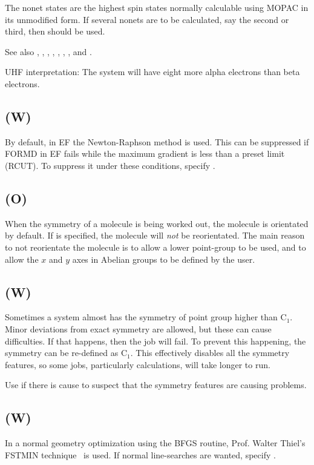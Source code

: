         The nonet states are the highest spin  states  normally  calculable
   using MOPAC in its unmodified form.
     If several nonets are to be calculated, say the second
   or third, then  should be used.

See also , , , , ,
, , and .

        UHF interpretation:  The system will have eight more alpha  electrons
   than beta electrons.

\subsection*{ (W)}
  By default, in EF the Newton-Raphson method is used.  This can be suppressed
if FORMD in EF fails while the maximum gradient is less than a preset limit
(RCUT). To suppress it under these conditions, specify .

\subsection*{ (O)}
When the symmetry of a molecule is being worked out, the molecule is
orientated by default.  If  is specified, the molecule will
{\em not} be reorientated.  The main reason to not reorientate the molecule
is to allow a lower point-group to be used, and to allow the $x$ and $y$ axes
in Abelian groups to be defined by the user.

\subsection*{ (W)}
\label{nosym}
Sometimes a system almost has the symmetry of point group higher than C$_1$.
Minor deviations from exact symmetry are allowed, but these can cause difficulties.
If that happens, then the job will fail.  To prevent this happening, the symmetry
can be re-defined as C$_1$.  This effectively disables all the symmetry features,
so some jobs, particularly  calculations, will take longer to run.

Use  if there is cause to suspect that the symmetry features are
causing problems.
\subsection*{ (W)}
           In a normal geometry optimization using the  BFGS  routine,  Prof.
Walter Thiel's 
   FSTMIN  technique~\cite{fstmin}  is  used.
If normal line-searches are wanted, specify
   .



